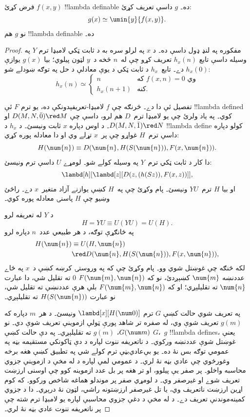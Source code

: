 \documentclass[../../../include/open-logic-section]{subfiles}
\begin{document}

\begin{lem}
فرض کړئ $f(x,y)$ !!{lambda definable} ده۔ $g$ داسې تعريف کړئ:
\[
g(x) \simeq \umin{y}{f(x,y)}.
\]
نو $g$ هم !!{lambda definable} ده۔
\end{lem}

\begin{proof}
مفکوره په لنډ ډول داسې ده۔ د $x$ په لرلو سره به د ثابت ټکي لامبډا
ترم $Y$ په وسيله داسې تابع $h_x(n)$ تعريف کړو چې له~$n$ څخه د~$y$
لټون پيلوي؛ بيا $g(x)$ يوازې $h_x(0)$ دے۔ تابع~$h_x$ د ثابت ټکي
د يوې معادلې د حل په توګه ښودلے شو:
\[
h_x(n) \simeq
\begin{cases}
n & \text{که $f(x,n) = 0$ وي} \\
h_x(n+1) & \text{کنه.}
\end{cases}
\]

تفصيل ئې دا دے۔ څرنګه چې $f$ لامبډا-تعريفېدونکې ده، يو ترم
$F$ ئې !!{lambda defined} کوي۔
په ياد ولرئ چې يو لامبډا ترم~$D$ هم لرو، داسې چې
$D(M, N, \bar{0}) \red M$ او $D(M, N, \bar{1})
\red N$۔ د اوس دپاره $x$ ثابت ونيسئ۔ د $h_x$ د !!{lambda define}
کولو دپاره داسې ترم~$H$ غواړو چې پر~$x$ تړلے وي او دا معادله پوره کړي:
\[
H(\num{n}) \equiv D(\num{n}, H(S(\num{n})), F(x, \num{n})).
\]
دا کار د ثابت ټکي ترم~$Y$ په وسيله کولے شو۔ لومړے $U$ داسې ترم
ونيسئ:
\[
\lambd[h][\lambd[z][D(z,(h(Sz)),F(x,z))]],
\]
او بيا $H$ ترم~$YU$ ونيسئ۔ پام وکړئ چې په~$H$ کښې يوازنے آزاد
متغير~$x$ دے۔ راځئ وښيو چې $H$ پاسنۍ معادله پوره کوي۔

د $Y$ له تعريفه لرو
\[
H = YU \equiv U(YU) = U(H).
\]
په ځانګړې توګه، د هر طبيعي عدد~$n$ دپاره لرو
\begin{align*}
H(\num{n}) & \equiv U(H, \num{n}) \\
& \red D(\num{n}, H(S(\num{n})), F(x, \num{n})),
\end{align*}
لکه څنګه چې غوښتل شوي وو۔ پام وکړئ چې که په وروستۍ کرښه کښې د~$x$
په ځاے عددنښه $\num{m}$ کښېږدئ، نو که $F(\num{m}, \num{n})$
$\num{0}$ ته تقليل شي، دا عبارت $\num{n}$ ته تقليلېږي؛ او که
$F(\num{m}, \num{n})$ بلې هرې عددنښې ته تقليل شي، نو عبارت
$H(S(\num{n}))$ ته تقليلېږي۔

په تعريف شوي حالت کښې $G$ ترم $\lambd[x][H(\num 0)]$ ونيسئ۔ د هر~$m$ دپاره که $g(m)$ تعريف شوې وي، له صفره تر شاهد پورې ټولې ازموينې تعريف شوې دي۔ نو $G(\num m)$، $\overline {g(m)}$ ته تقليلېږي۔ په دې حالت کښې $G$،~$g$ !!{lambda define}s، يعنې غوښتل شوې عددنښه ورکوي۔
د ناتعريفه ننوت لپاره د دې ټاکونکي مستقيمه بڼه په عمومي توګه بس نۀ ده۔ يو بې‌عادي‌بڼې ترم کولے شي په تطبيق کښې هغه برخه وغورځوي چې عادي بڼه نۀ لري۔ د عمومي لمې لپاره د  له مخې د ازموينې جزوي محاسبه واخلو۔ پر صفر يې پيلوو، او تر هغه پر بل عدد ازموينه کوو چې اوسنی ارزښت تعريف شوے او غيرصفر وي۔ د لومړي صفر پر موندلو هماغه شاخص ورکوو۔ که کوم اړين ارزښت ناتعريف وي، يا تل غيرصفر ارزښتونه راشي، لټون نۀ درېږي۔ دا د جزوي کمينه‌موندنې تعريف دے۔ د  له مخې د دغې جزوي محاسبې لپاره يو لامبډا ترم شته چې پر ناتعريفه ننوت عادي بڼه نۀ لري۔
\end{proof}
\end{document}
